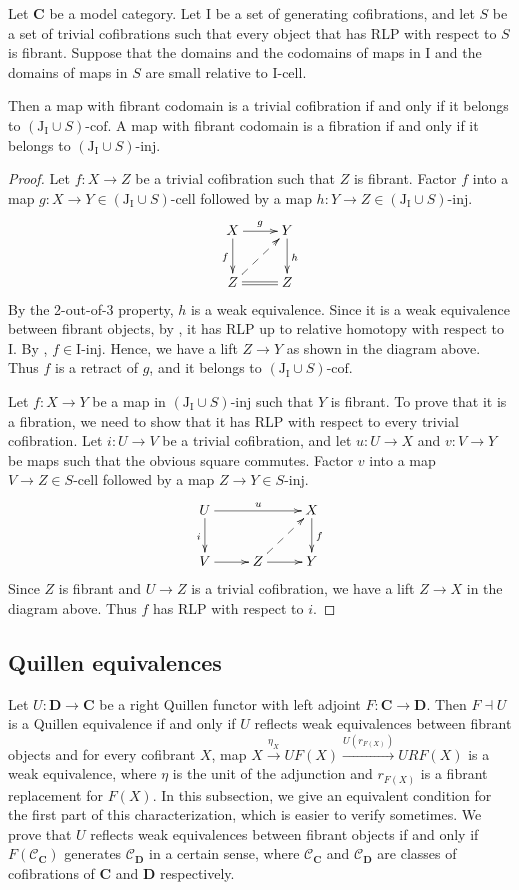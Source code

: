 \documentclass{tac}
\theoremstyle{definition}
\newcommand{\cof}{\mathcal{C}}
\newcommand{\cat}[1]{\mathbf{#1}}
\newcommand{\C}{\cat{C}}
\newcommand{\D}{\cat{D}}
\newcommand{\I}{\mathrm{I}}
\newcommand{\J}{\mathrm{J}}
\newcommand{\class}[2]{#1\text{-}\mathrm{#2}}
\newcommand{\Iinj}[1][\I]{\class{#1}{inj}}
\newcommand{\Icell}[1][\I]{\class{#1}{cell}}
\newcommand{\Icof}[1][\I]{\class{#1}{cof}}
\begin{document}
\begin{prop}
Let $\C$ be a model category.
Let $\I$ be a set of generating cofibrations, and let $S$ be a set of trivial cofibrations
such that every object that has RLP with respect to $S$ is fibrant.
Suppose that the domains and the codomains of maps in $\I$ and the domains of maps in $S$ are small relative to $\Icell$.

Then a map with fibrant codomain is a trivial cofibration if and only if it belongs to $\Icof[(\J_\I \cup S)]$.
A map with fibrant codomain is a fibration if and only if it belongs to $\Iinj[(\J_\I \cup S)]$.
\end{prop}
\begin{proof}
Let $f : X \to Z$ be a trivial cofibration such that $Z$ is fibrant.
Factor $f$ into a map $g : X \to Y \in \Icell[(\J_\I \cup S)]$ followed by a map $h : Y \to Z \in \Iinj[(\J_\I \cup S)]$.
\[ \xymatrix{ X \ar[r]^g \ar[d]_f & Y \ar[d]^h \\
              Z \ar@{=}[r] \ar@{-->}[ur] & Z
            } \]
By the 2-out-of-3 property, $h$ is a weak equivalence.
Since it is a weak equivalence between fibrant objects, by , it has RLP up to relative homotopy with respect to $\I$.
By , $f \in \Iinj$.
Hence, we have a lift $Z \to Y$ as shown in the diagram above.
Thus $f$ is a retract of $g$, and it belongs to $\Icof[(\J_\I \cup S)]$.

Let $f : X \to Y$ be a map in $\Iinj[(\J_\I \cup S)]$ such that $Y$ is fibrant.
To prove that it is a fibration, we need to show that it has RLP with respect to every trivial cofibration.
Let $i : U \to V$ be a trivial cofibration, and let $u : U \to X$ and $v : V \to Y$ be maps such that the obvious square commutes.
Factor $v$ into a map $V \to Z \in \Icell[S]$ followed by a map $Z \to Y \in \Iinj[S]$.
\[ \xymatrix{ U \ar[rr]^u \ar[d]_i & & X \ar[d]^f \\
              V \ar[r] & Z \ar[r] \ar@{-->}[ur] & Y
            } \]
Since $Z$ is fibrant and $U \to Z$ is a trivial cofibration, we have a lift $Z \to X$ in the diagram above.
Thus $f$ has RLP with respect to $i$.
\end{proof}

\subsection{Quillen equivalences}

Let $U : \D \to \C$ be a right Quillen functor with left adjoint $F : \C \to \D$.
Then $F \dashv U$ is a Quillen equivalence if and only if $U$ reflects weak equivalences between fibrant objects and
for every cofibrant $X$, map $X \xrightarrow{\eta_X} UF(X) \xrightarrow{U(r_{F(X)})} URF(X)$ is a weak equivalence,
where $\eta$ is the unit of the adjunction and $r_{F(X)}$ is a fibrant replacement for $F(X)$.
In this subsection, we give an equivalent condition for the first part of this characterization, which is easier to verify sometimes.
We prove that $U$ reflects weak equivalences between fibrant objects if and only if $F(\cof_\C)$ generates $\cof_\D$ in a certain sense,
where $\cof_\C$ and $\cof_\D$ are classes of cofibrations of $\C$ and $\D$ respectively.
\end{document}

